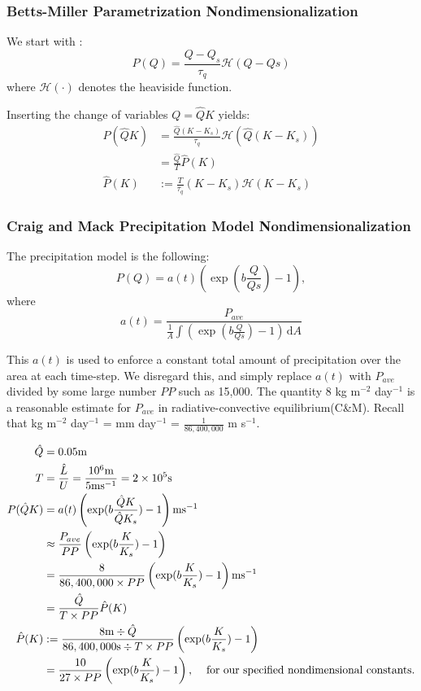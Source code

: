 \documentclass[10pt]{article}
\newcommand{\rmd}{\,\mathrm{d}}
\newcommand{\HH}{\mathcal{H}}
\begin{document}
\subsubsection*{Betts-Miller Parametrization Nondimensionalization }

We start with :
\begin{equation*}
P(Q) = \frac{Q-Q_s}{\tau_q}\HH{(Q-Qs)}
\end{equation*}
where $\HH(\cdot)$ denotes the heaviside function. 

Inserting the change of variables $Q = \hat{Q}K$ yields:
\begin{align*}
P(\hat{Q}K) &= \frac{\hat{Q}(K-K_s)}{\tau_q} \HH{(\hat{Q}(K-K_s))}\\
&= \frac{\hat{Q}}{T} \hat{P}(K)\\
\hat{P}(K) &:= \frac{T}{\tau_q}(K-K_s)\HH{(K-K_s)}
\end{align*}


\subsubsection*{Craig and Mack Precipitation Model Nondimensionalization}

The precipitation model is the following:
\begin{equation}
P(Q) = a(t)\left(\exp(b\frac{Q}{Qs})-1\right),
\end{equation}
where 
\begin{equation}
a(t) = \frac{P_{ave}}{\frac{1}{A}\int \left( \exp(b\frac{Q}{Qs})-1 \right)\rmd A}
\end{equation}

This $a(t)$ is used to enforce a constant total amount of precipitation over the area at each time-step. We disregard this, and simply replace $a(t)$ with $P_{ave}$ divided by some large number $PP$ such as 15,000. The quantity $8$ kg m$^{-2}$ day$^{-1}$ is a reasonable estimate for $P_{ave}$ in radiative-convective equilibrium(C\&M).
Recall that kg m$^{-2}$ day$^{-1}$ = mm day$^{-1}$ = $\frac{1}{86,400,000}$ m s$^{-1}$. 

\begin{align*}
\hat{Q} &= 0.05 \text{m} \\
T &= \frac{\hat{L}}{U} = \frac{10^6\text{m}}{5\text{ms}^{-1}} = 2 \times 10^{5} \text{s}\\
P(\hat{Q}K) &= a(t)\left(\exp(b\frac{\hat{Q}K}{\hat{Q}K_s})-1\right)\text{ms}^{-1}\\
&\approx \frac{P_{ave}}{PP} \left(\exp(b\frac{K}{K_s})-1\right) \\
&=\frac{8}{86,400,000 \times PP}\left(\exp(b\frac{K}{K_s})-1\right) \text{ms}^{-1} \\
&= \frac{\hat{Q}}{T \times PP}\hat{P}(K) \\
\hat{P}(K) &:= \frac{8 \text{m}\div \hat{Q}}{86,400,000 \text{s}\div T \times PP}\left(\exp(b\frac{K}{K_s})-1\right) \\
&= \frac{10}{27\times PP }\left(\exp(b\frac{K}{K_s})-1\right)\text{, \quad for our specified nondimensional constants.}
\end{align*}
\end{document}
